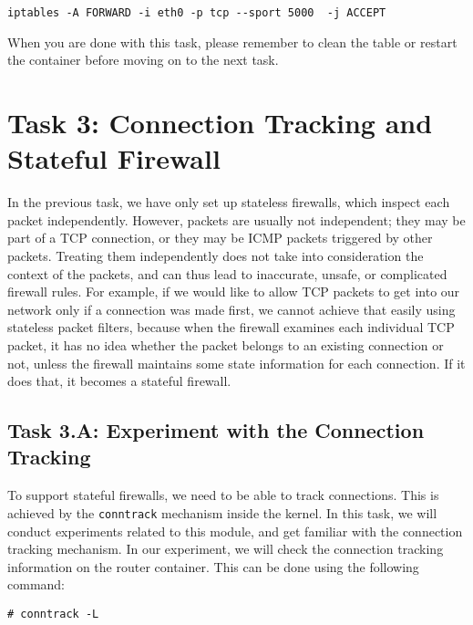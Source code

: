 \begin{lstlisting}
iptables -A FORWARD -i eth0 -p tcp --sport 5000  -j ACCEPT
\end{lstlisting}


When you are done with this task,
please remember to clean the table or restart the container 
before moving on to the next task.




\section{Task 3: Connection Tracking and Stateful Firewall}


In the previous task, we have only set up stateless firewalls, which inspect each
packet independently. However, packets
are usually not independent; they may be part of a TCP connection,
or they may be ICMP packets triggered by other packets. Treating them
independently does not take into consideration the context of the
packets, and can thus lead to inaccurate, unsafe, or complicated firewall rules.
For example, if we would like to allow TCP packets to get into our network
only if a connection was made first, we cannot achieve that easily 
using stateless packet filters, because when the firewall examines each individual TCP packet,
it has no idea whether the packet belongs to an existing connection
or not, unless the firewall maintains some state information for each connection.
If it does that, it becomes a stateful firewall.


\subsection{Task 3.A: Experiment with the Connection Tracking} 


To support stateful firewalls, we need to be able to track connections. 
This is achieved by the \texttt{conntrack} mechanism inside the kernel. 
In this task, we will conduct experiments related to this module, and 
get familiar with the connection tracking mechanism. 
In our experiment, we will check the connection tracking information
on the router container. This can be done using the following command: 

\begin{lstlisting}
# conntrack -L
\end{lstlisting}

